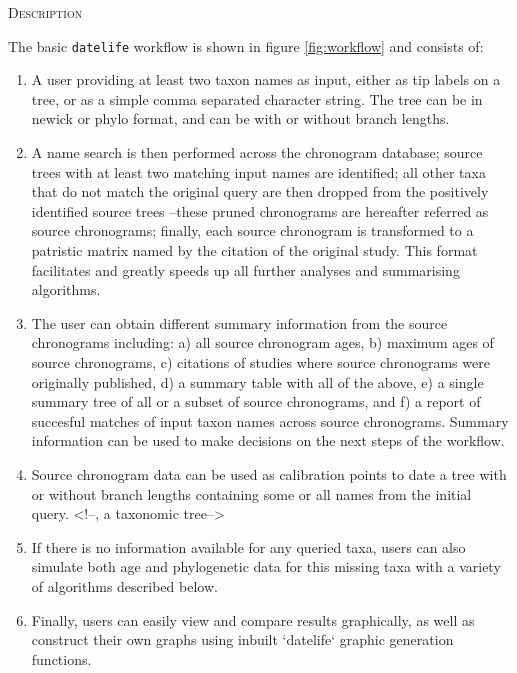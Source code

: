 \documentclass[]{article}
\begin{document}
\begin{center}
\textsc{Description}
\end{center}

The basic \texttt{datelife} workflow is shown in figure \ref{fig:workflow} and consists of:

\begin{enumerate}
\item A user providing at least two taxon names as input, either as tip labels on a tree, or as a simple comma separated character string. The tree can be in newick or phylo format, and can be with or without branch lengths.
\item A name search is then performed across the chronogram database; source trees with at least two matching input names are identified; all other taxa that do not match the original query are then dropped from the positively identified source trees --these pruned chronograms are hereafter referred as source chronograms; finally, each source chronogram is transformed to a patristic matrix named by the citation of the original study. This format facilitates and greatly speeds up all further analyses and summarising algorithms.
\item  The user can obtain different summary information from the source chronograms including: a) all source chronogram ages, b) maximum ages of source chronograms, c) citations of studies where source chronograms were originally published, d) a summary table with all of the above, e) a single summary tree of all or a subset of source chronograms, and f) a report of succesful matches of input taxon names across source chronograms. Summary information can be used to make decisions on the next steps of the workflow. 
\item  Source chronogram data can be used as calibration points to date a tree with or without branch lengths containing some or all names from the initial query. <!--, a taxonomic tree-->
\item  If there is no information available for any queried taxa, users can also simulate both age and phylogenetic data for this missing taxa with a variety of algorithms described below.
\item  Finally, users can easily view and compare results graphically, as well as construct their own graphs using inbuilt `datelife` graphic generation functions.
\end{enumerate}
\end{document}
